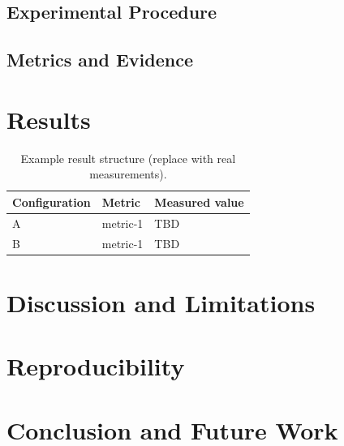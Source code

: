 \documentclass[conference]{IEEEtran}
\begin{document}
\subsection{Experimental Procedure}

\subsection{Metrics and Evidence}

\section{Results}

\begin{table}[t]
\centering
\caption{Example result structure (replace with real measurements).}
\label{tab:results}
\begin{tabular}{lll}
\toprule
Configuration & Metric & Measured value \\
\midrule
A & metric-1 & TBD \\
B & metric-1 & TBD \\
\bottomrule
\end{tabular}
\end{table}

\section{Discussion and Limitations}

\section{Reproducibility}

\section{Conclusion and Future Work}
\end{document}
